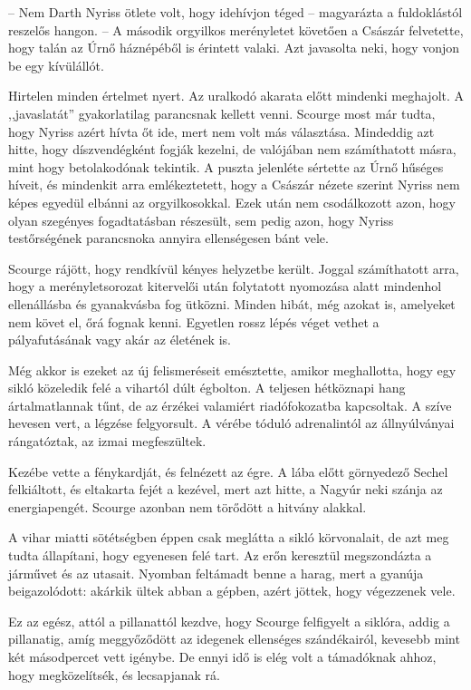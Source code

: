 \documentclass{thesis-ekf}
\theoremstyle{definition}
\begin{document}
-- Nem Darth Nyriss ötlete volt, hogy idehívjon téged -- magyarázta a fuldoklástól reszelős
hangon. -- A második orgyilkos merényletet követően a Császár felvetette, hogy talán az Úrnő
háznépéből is érintett valaki. Azt javasolta neki, hogy vonjon be egy kívülállót.

Hirtelen minden értelmet nyert. Az uralkodó akarata előtt mindenki meghajolt. A ,,javaslatát''
gyakorlatilag parancsnak kellett venni. Scourge most már tudta, hogy Nyriss azért hívta őt ide,
mert nem volt más választása. Mindeddig azt hitte, hogy díszvendégként fogják kezelni, de
valójában nem számíthatott másra, mint hogy betolakodónak tekintik. A puszta jelenléte
sértette az Úrnő hűséges híveit, és mindenkit arra emlékeztetett, hogy a Császár nézete szerint
Nyriss nem képes egyedül elbánni az orgyilkosokkal. Ezek után nem csodálkozott azon, hogy
olyan szegényes fogadtatásban részesült, sem pedig azon, hogy Nyriss testőrségének
parancsnoka annyira ellenségesen bánt vele.

Scourge rájött, hogy rendkívül kényes helyzetbe került. Joggal számíthatott arra, hogy a
merényletsorozat kitervelői után folytatott nyomozása alatt mindenhol ellenállásba és
gyanakvásba fog ütközni. Minden hibát, még azokat is, amelyeket nem követ el, őrá fognak
kenni. Egyetlen rossz lépés véget vethet a pályafutásának vagy akár az életének is.

Még akkor is ezeket az új felismeréseit emésztette, amikor meghallotta, hogy egy sikló
közeledik felé a vihartól dúlt égbolton. A teljesen hétköznapi hang ártalmatlannak tűnt, de az
érzékei valamiért riadófokozatba kapcsoltak. A szíve hevesen vert, a légzése felgyorsult. A
vérébe tóduló adrenalintól az állnyúlványai rángatóztak, az izmai megfeszültek.

Kezébe vette a fénykardját, és felnézett az égre. A lába előtt görnyedező Sechel felkiáltott,
és eltakarta fejét a kezével, mert azt hitte, a Nagyúr neki szánja az energiapengét. Scourge
azonban nem törődött a hitvány alakkal.

A vihar miatti sötétségben éppen csak meglátta a sikló körvonalait, de azt meg tudta állapítani, hogy egyenesen felé tart. Az erőn keresztül megszondázta a járművet és az utasait. Nyomban feltámadt benne a harag, mert a gyanúja beigazolódott: akárkik ültek abban a gépben, azért jöttek, hogy végezzenek vele.

Ez az egész, attól a pillanattól kezdve, hogy Scourge felfigyelt a siklóra, addig a pillanatig,
amíg meggyőződött az idegenek ellenséges szándékairól, kevesebb mint két másodpercet vett
igénybe. De ennyi idő is elég volt a támadóknak ahhoz, hogy megközelítsék, és lecsapjanak rá.
\end{document}
